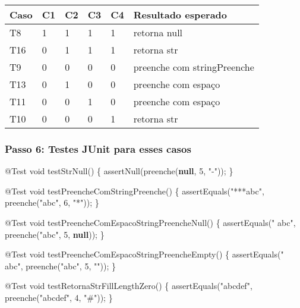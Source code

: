 \documentclass[
  letterpaper,
  DIV=11,
  numbers=noendperiod]{scrartcl}
\newenvironment{Shaded}{}{}
\newcommand{\AttributeTok}[1]{\textcolor[rgb]{0.49,0.56,0.16}{#1}}
\newcommand{\DataTypeTok}[1]{\textcolor[rgb]{0.56,0.13,0.00}{#1}}
\newcommand{\DecValTok}[1]{\textcolor[rgb]{0.25,0.63,0.44}{#1}}
\newcommand{\FunctionTok}[1]{\textcolor[rgb]{0.02,0.16,0.49}{#1}}
\newcommand{\KeywordTok}[1]{\textcolor[rgb]{0.00,0.44,0.13}{\textbf{#1}}}
\newcommand{\OperatorTok}[1]{\textcolor[rgb]{0.40,0.40,0.40}{#1}}
\newcommand{\StringTok}[1]{\textcolor[rgb]{0.25,0.44,0.63}{#1}}
\begin{document}
\begin{longtable}[]{@{}llllll@{}}
\toprule\noalign{}
Caso & C1 & C2 & C3 & C4 & Resultado esperado \\
\midrule\noalign{}
\endhead
\bottomrule\noalign{}
\endlastfoot
T8 & 1 & 1 & 1 & 1 & retorna null \\
T16 & 0 & 1 & 1 & 1 & retorna str \\
T9 & 0 & 0 & 0 & 0 & preenche com stringPreenche \\
T13 & 0 & 1 & 0 & 0 & preenche com espaço \\
T11 & 0 & 0 & 1 & 0 & preenche com espaço \\
T10 & 0 & 0 & 0 & 1 & retorna str \\
\end{longtable}

\subsubsection{Passo 6: Testes JUnit para esses
casos}\label{passo-6-testes-junit-para-esses-casos}

\begin{Shaded}
\begin{Highlighting}[]
\AttributeTok{@Test}
\DataTypeTok{void} \FunctionTok{testStrNull}\OperatorTok{()} \OperatorTok{\{}
    \FunctionTok{assertNull}\OperatorTok{(}\FunctionTok{preenche}\OperatorTok{(}\KeywordTok{null}\OperatorTok{,} \DecValTok{5}\OperatorTok{,} \StringTok{"{-}"}\OperatorTok{));}
\OperatorTok{\}}

\AttributeTok{@Test}
\DataTypeTok{void} \FunctionTok{testPreencheComStringPreenche}\OperatorTok{()} \OperatorTok{\{}
    \FunctionTok{assertEquals}\OperatorTok{(}\StringTok{"***abc"}\OperatorTok{,} \FunctionTok{preenche}\OperatorTok{(}\StringTok{"abc"}\OperatorTok{,} \DecValTok{6}\OperatorTok{,} \StringTok{"*"}\OperatorTok{));}
\OperatorTok{\}}

\AttributeTok{@Test}
\DataTypeTok{void} \FunctionTok{testPreencheComEspacoStringPreencheNull}\OperatorTok{()} \OperatorTok{\{}
    \FunctionTok{assertEquals}\OperatorTok{(}\StringTok{"  abc"}\OperatorTok{,} \FunctionTok{preenche}\OperatorTok{(}\StringTok{"abc"}\OperatorTok{,} \DecValTok{5}\OperatorTok{,} \KeywordTok{null}\OperatorTok{));}
\OperatorTok{\}}

\AttributeTok{@Test}
\DataTypeTok{void} \FunctionTok{testPreencheComEspacoStringPreencheEmpty}\OperatorTok{()} \OperatorTok{\{}
    \FunctionTok{assertEquals}\OperatorTok{(}\StringTok{"  abc"}\OperatorTok{,} \FunctionTok{preenche}\OperatorTok{(}\StringTok{"abc"}\OperatorTok{,} \DecValTok{5}\OperatorTok{,} \StringTok{""}\OperatorTok{));}
\OperatorTok{\}}

\AttributeTok{@Test}
\DataTypeTok{void} \FunctionTok{testRetornaStrFillLengthZero}\OperatorTok{()} \OperatorTok{\{}
    \FunctionTok{assertEquals}\OperatorTok{(}\StringTok{"abcdef"}\OperatorTok{,} \FunctionTok{preenche}\OperatorTok{(}\StringTok{"abcdef"}\OperatorTok{,} \DecValTok{4}\OperatorTok{,} \StringTok{"\#"}\OperatorTok{));}
\OperatorTok{\}}
\end{Highlighting}
\end{Shaded}
\end{document}

